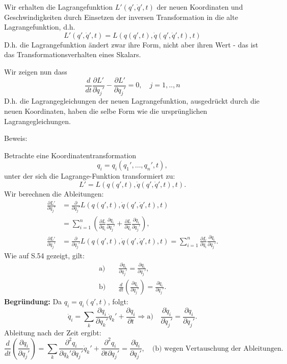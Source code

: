 \documentclass[10pt, letterpaper]{article}
\begin{document}
Wir erhalten die Lagrangefunktion $L'(q',\dot{q}',t)$ der neuen Koordinaten und Geschwindigkeiten durch Einsetzen der inversen Transformation in die alte Lagrangefunktion, d.h.
$$L'(q',\dot{q}',t) = L(q(q',t),\dot{q}(q',\dot{q}',t),t)$$
D.h. die Lagrangefunktion ändert zwar ihre Form, nicht aber ihren Wert - das ist das Transformationsverhalten eines Skalars.

Wir zeigen nun dass
$$\dfrac{d}{dt}\dfrac{\partial L'}{\partial \dot{q}_j'} - \dfrac{\partial L'}{\partial q_j'} = 0, \quad j=1,..,n$$
D.h. die Lagrangegleichungen der neuen Lagrangefunktion, ausgedrückt durch die neuen Koordinaten, haben die selbe Form wie die ursprünglichen Lagrangegleichungen.

Beweis:

Betrachte eine Koordinatentransformation
\[
q_i = q_i(q_1', \dotsc, q_n', t),
\]
unter der sich die Lagrange-Funktion transformiert zu:
\[
L' = L(q(q',t), \dot{q}(q', \dot{q}', t), t).
\]
Wir berechnen die Ableitungen:
\begin{align*}
\frac{\partial L'}{\partial q_j'} 
&= \frac{\partial}{\partial q_j'} L(q(q',t), \dot{q}(q', \dot{q}', t), t) \\
&= \sum_{i=1}^n \left( 
    \frac{\partial L}{\partial q_i} \frac{\partial q_i}{\partial q_j'} 
  + \frac{\partial L}{\partial \dot{q}_i} \frac{\partial \dot{q}_i}{\partial q_j'} 
\right), \\[1ex]
\frac{\partial L'}{\partial \dot{q}_j'} 
&= \frac{\partial}{\partial \dot{q}_j'} L(q(q',t), \dot{q}(q', \dot{q}', t), t) 
= \sum_{i=1}^n \frac{\partial L}{\partial \dot{q}_i} \frac{\partial \dot{q}_i}{\partial \dot{q}_j'}.
\end{align*}
Wie auf S.54 gezeigt, gilt:
\begin{align*}
\text{a)}\quad &\frac{\partial \dot{q}_i}{\partial \dot{q}_j'} = \frac{\partial q_i}{\partial q_j'}, \\
\text{b)}\quad &\frac{d}{dt} \left( \frac{\partial q_i}{\partial q_j'} \right) = \frac{\partial \dot{q}_i}{\partial q_j'}.
\end{align*}
\textbf{Begründung:}  
Da \( q_i = q_i(q', t) \), folgt:
\[
\dot{q}_i = \sum_k \frac{\partial q_i}{\partial q_k'} \dot{q}_k' + \frac{\partial q_i}{\partial t}
\Rightarrow \text{a)} \quad \frac{\partial \dot{q}_i}{\partial \dot{q}_j'} = \frac{\partial q_i}{\partial q_j'}.
\]
Ableitung nach der Zeit ergibt:
\[
\frac{d}{dt} \left( \frac{\partial q_i}{\partial q_j'} \right)
= \sum_k \frac{\partial^2 q_i}{\partial q_k' \partial q_j'} \dot{q}_k' + \frac{\partial^2 q_i}{\partial t \partial q_j'}
= \frac{\partial \dot{q}_i}{\partial q_j'}, \quad \text{(b) wegen Vertauschung der Ableitungen}.
\]
\end{document}
